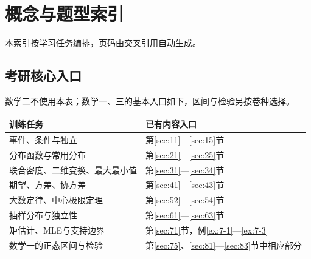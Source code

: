 \chapter{概念与题型索引}\label{app:index}
本索引按学习任务编排，页码由交叉引用自动生成。
\section{考研核心入口}\label{app:exam_core}
数学二不使用本表；数学一、三的基本入口如下，区间与检验另按卷种选择。
\begin{longtable}{@{}p{}p{}@{}}
\toprule 训练任务&已有内容入口\\\midrule\endhead
事件、条件与独立&第\ref{sec:11}—\ref{sec:15}节\\
分布函数与常用分布&第\ref{sec:21}—\ref{sec:25}节\\
联合密度、二维变换、最大最小值&第\ref{sec:31}—\ref{sec:34}节\\
期望、方差、协方差&第\ref{sec:41}—\ref{sec:43}节\\
大数定律、中心极限定理&第\ref{sec:52}—\ref{sec:54}节\\
抽样分布与独立性&第\ref{sec:61}—\ref{sec:63}节\\
矩估计、MLE与支持边界&第\ref{sec:71}节，例\ref{ex:7-1}—\ref{ex:7-3}\\
数学一的正态区间与检验&第\ref{sec:75}、\ref{sec:81}—\ref{sec:83}节中相应部分\\
\bottomrule\end{longtable}
